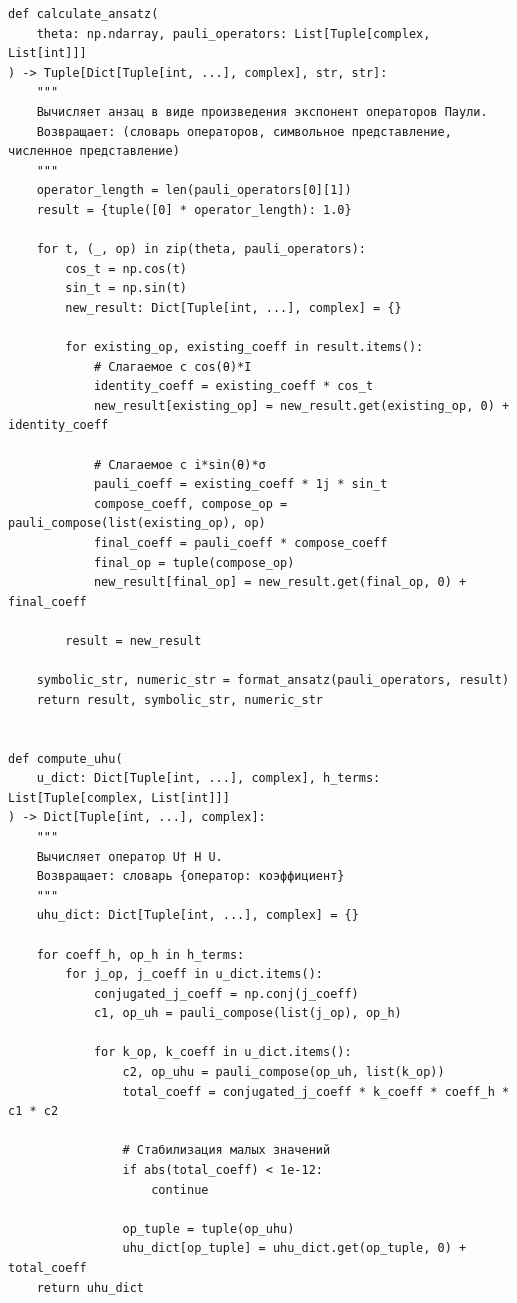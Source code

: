 \documentclass[a4paper]{report}
\begin{document}
\begin{lstlisting}
def calculate_ansatz(
    theta: np.ndarray, pauli_operators: List[Tuple[complex, List[int]]]
) -> Tuple[Dict[Tuple[int, ...], complex], str, str]:
    """
    Вычисляет анзац в виде произведения экспонент операторов Паули.
    Возвращает: (словарь операторов, символьное представление, численное представление)
    """
    operator_length = len(pauli_operators[0][1])
    result = {tuple([0] * operator_length): 1.0}

    for t, (_, op) in zip(theta, pauli_operators):
        cos_t = np.cos(t)
        sin_t = np.sin(t)
        new_result: Dict[Tuple[int, ...], complex] = {}

        for existing_op, existing_coeff in result.items():
            # Слагаемое с cos(θ)*I
            identity_coeff = existing_coeff * cos_t
            new_result[existing_op] = new_result.get(existing_op, 0) + identity_coeff

            # Слагаемое с i*sin(θ)*σ
            pauli_coeff = existing_coeff * 1j * sin_t
            compose_coeff, compose_op = pauli_compose(list(existing_op), op)
            final_coeff = pauli_coeff * compose_coeff
            final_op = tuple(compose_op)
            new_result[final_op] = new_result.get(final_op, 0) + final_coeff

        result = new_result

    symbolic_str, numeric_str = format_ansatz(pauli_operators, result)
    return result, symbolic_str, numeric_str


def compute_uhu(
    u_dict: Dict[Tuple[int, ...], complex], h_terms: List[Tuple[complex, List[int]]]
) -> Dict[Tuple[int, ...], complex]:
    """
    Вычисляет оператор U† H U.
    Возвращает: словарь {оператор: коэффициент}
    """
    uhu_dict: Dict[Tuple[int, ...], complex] = {}

    for coeff_h, op_h in h_terms:
        for j_op, j_coeff in u_dict.items():
            conjugated_j_coeff = np.conj(j_coeff)
            c1, op_uh = pauli_compose(list(j_op), op_h)

            for k_op, k_coeff in u_dict.items():
                c2, op_uhu = pauli_compose(op_uh, list(k_op))
                total_coeff = conjugated_j_coeff * k_coeff * coeff_h * c1 * c2

                # Стабилизация малых значений
                if abs(total_coeff) < 1e-12:
                    continue

                op_tuple = tuple(op_uhu)
                uhu_dict[op_tuple] = uhu_dict.get(op_tuple, 0) + total_coeff
    return uhu_dict



\end{lstlisting}
\end{document}
